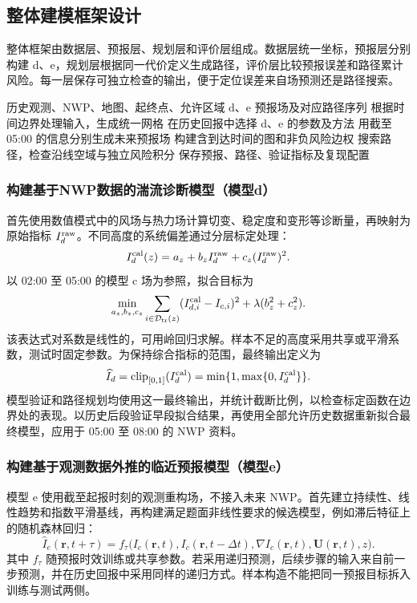 \subsection{整体建模框架设计}
整体框架由数据层、预报层、规划层和评价层组成。数据层统一坐标，预报层分别构建 d、e，规划层根据同一代价定义生成路径，评价层比较预报误差和路径累计风险。每一层保存可独立检查的输出，便于定位误差来自场预测还是路径搜索。
\begin{algorithm}[H]\caption{低空飞行湍流预警与航路规划系统架构}
\begin{algorithmic}[1]
\REQUIRE 历史观测、NWP、地图、起终点、允许区域
\ENSURE d、e 预报场及对应路径序列
\STATE 根据时间边界处理输入，生成统一网格
\STATE 在历史回报中选择 d、e 的参数及方法
\STATE 用截至 05:00 的信息分别生成未来预报场
\STATE 构建含到达时间的图和非负风险边权
\STATE 搜索路径，检查沿线空域与独立风险积分
\STATE 保存预报、路径、验证指标及复现配置
\end{algorithmic}\end{algorithm}
\subsubsection{构建基于NWP数据的湍流诊断模型（模型d）}
首先使用数值模式中的风场与热力场计算切变、稳定度和变形等诊断量，再映射为原始指标 $I_d^{\rm raw}$。不同高度的系统偏差通过分层标定处理：
\begin{equation}
I_d^{\rm cal}(z)=a_z+b_zI_d^{\rm raw}+c_z(I_d^{\rm raw})^2.
\end{equation}
以 02:00 至 05:00 的模型 c 场为参照，拟合目标为
\begin{equation}
\min_{a_z,b_z,c_z}\sum_{i\in\mathcal D_{\rm tr}(z)}
(I_{d,i}^{\rm cal}-I_{c,i})^2+\lambda(b_z^2+c_z^2).
\end{equation}
该表达式对系数是线性的，可用岭回归求解。样本不足的高度采用共享或平滑系数，测试时固定参数。为保持综合指标的范围，最终输出定义为
\begin{equation}
\widehat I_d=\operatorname{clip}_{[0,1]}(I_d^{\rm cal})
=\min\{1,\max\{0,I_d^{\rm cal}\}\}.
\end{equation}
模型验证和路径规划均使用这一最终输出，并统计截断比例，以检查标定函数在边界处的表现。以历史后段验证早段拟合结果，再使用全部允许历史数据重新拟合最终模型，应用于 05:00 至 08:00 的 NWP 资料。
\subsubsection{构建基于观测数据外推的临近预报模型（模型e）}
模型 e 使用截至起报时刻的观测重构场，不接入未来 NWP。首先建立持续性、线性趋势和指数平滑基线，再构建满足题面非线性要求的候选模型，例如滞后特征上的随机森林回归：
\begin{equation}
\widehat I_e(\bm r,t+\tau)=f_\tau\bigl(I_c(\bm r,t),I_c(\bm r,t-\Delta t),
\nabla I_c(\bm r,t),\bm U(\bm r,t),z\bigr).
\end{equation}
其中 $f_\tau$ 随预报时效训练或共享参数。若采用递归预测，后续步骤的输入来自前一步预测，并在历史回报中采用同样的递归方式。样本构造不能把同一预报目标拆入训练与测试两侧。

